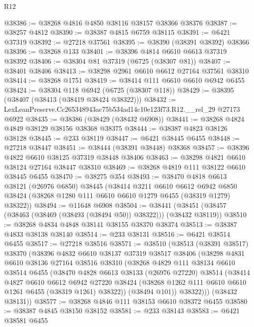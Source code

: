 \begin{lexlean}{R12}
\begin{coremodule}
@38386 := @38268 @4816 @4850 @38116 @38157 @38366 @38376
@38387 := @38257 @4812
@38390 := @38387 @4815 @6759 @38115
@38391 := @6421 @37319
@38392 := @27218 @37561
@38395 := @38390 (@38391 @38392) @38366
@38396 := @38268 @133
@38401 := @38396 @4814 @6610 @6613 @37319 @38392
@38406 := @38304 @81 @37319 (@6725 (@38307 @81))
@38407 := @38401 @38406
@38413 := @38298 @2961 @6610 @6612 @27164 @37561 @38310
@38414 := @38268 @1751
@38419 := @38414 @111 @6610 @6610 @6942 @6455
@38424 := @38304 @118 @6942 (@6725 (@38307 @118))
@38429 := @38395 (@38407 (@38413 (@38419 @38424 @38322)))
@38432 := LexLeanPreserve.Cc265348943ac75b534ad14c10e123f73.R12.__rel_29 @27173 @6922
@38435 := @38386 (@38429 (@38432 @6908))
@38441 := @38268 @4824 @4849 @38129 @38156 @38368 @38375
@38444 := @38387 @4823 @38126 @38128
@38445 := @233 @38119
@38447 := @6421 @38445 @6455
@38448 := @27218 @38447
@38451 := @38444 (@38391 @38448) @38368
@38457 := @38396 @4822 @6610 @38125 @37319 @38448 @38406
@38463 := @38298 @4821 @6610 @38124 @27164 @38447 @38310
@38469 := @38268 @4819 @111 @38122 @6610 @38445 @6455
@38470 := @38275 @354
@38493 := @38470
    @4818
    @6613
    @38121
    (@26976 @6850)
    @38445
    (@38414
      @3211
      @6610
      @6612
      @6942
      @6850
      @38424
      (@38268 @1280 @111 @6610 @6610 @1279 @6455 (@38319 @1279) @38322))
@38494 := @11648 @6908
@38504 := @38441 (@38451 (@38457 (@38463 (@38469 (@38493 (@38494 @50)) @38322))) (@38432 @38119))
@38510 := @38268 @4834 @4848 @38141 @38155 @38370 @38374
@38513 := @38387 @4833 @38138 @38140
@38514 := @233 @38131
@38516 := @6421 @38514 @6455
@38517 := @27218 @38516
@38571 := @38510
    (@38513
      (@38391 @38517)
      @38370
      (@38396
        @4832
        @6610
        @38137
        @37319
        @38517
        @38406
        (@38298
          @4831
          @6610
          @38136
          @27164
          @38516
          @38310
          (@38268
            @4829
            @111
            @38134
            @6610
            @38514
            @6455
            (@38470
              @4828
              @6613
              @38133
              (@26976 @27220)
              @38514
              (@38414
                @4827
                @6610
                @6612
                @6942
                @27220
                @38424
                (@38268 @1262 @111 @6610 @6610 @1261 @6455 (@38319 @1261) @38322))
              (@38494 @101))
            @38322)))
      (@38432 @38131))
@38577 := @38268 @4846 @111 @38153 @6610 @38372 @6455
@38580 := @38387 @4845 @38150 @38152
@38581 := @233 @38143
@38583 := @6421 @38581 @6455

\end{coremodule}
\end{lexlean}
